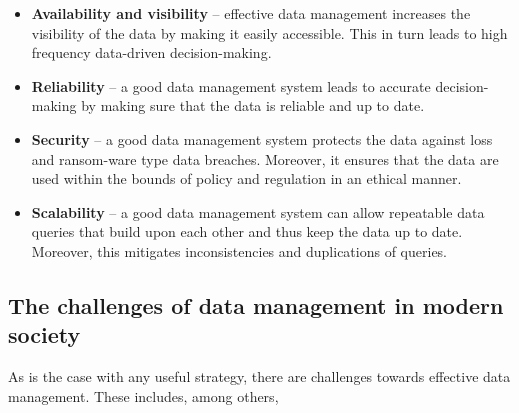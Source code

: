 \documentclass[
]{book}
\begin{document}
\begin{itemize}
\item
  \textbf{Availability and visibility} -- effective data management increases the visibility of the data by making it easily accessible. This in turn leads to high frequency data-driven decision-making.
\item
  \textbf{Reliability} -- a good data management system leads to accurate decision-making by making sure that the data is reliable and up to date. ~~~
\item
  \textbf{Security} -- a good data management system protects the data against loss and ransom-ware type data breaches. Moreover, it ensures that the data are used within the bounds of policy and regulation in an ethical manner.
\item
  \textbf{Scalability} -- a good data management system can allow repeatable data queries that build upon each other and thus keep the data up to date. Moreover, this mitigates inconsistencies and duplications of queries.
\end{itemize}

\subsection{The challenges of data management in modern society}\label{the-challenges-of-data-management-in-modern-society}

As is the case with any useful strategy, there are challenges towards effective data management. These includes, among others,
\end{document}
